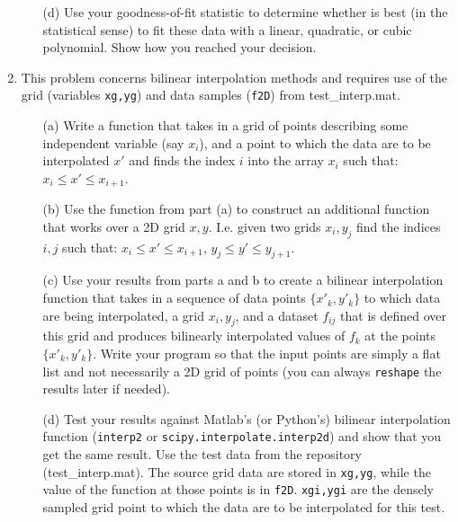 \documentclass{article}
\begin{document}
\begin{enumerate}
\begin{itemize}
    \item[(d)] Use your goodness-of-fit statistic to determine whether is best (in the statistical sense) to fit these data with a linear, quadratic, or cubic polynomial.  Show how you reached your decision.  
  \end{itemize}
  \item This problem concerns bilinear interpolation methods and requires use of the grid (variables \texttt{xg,yg}) and data samples (\texttt{f2D}) from \textsf{test\_interp.mat}.  
  \begin{itemize}
    \item[(a)]  Write a function that takes in a grid of points describing some independent variable (say $x_i$), and a point to which the data are to be interpolated $x'$ and finds the index $i$ into the array $x_i$ such that:  $x_i \le x' \le x_{i+1}$.  
    \item[(b)]  Use the function from part (a) to construct an additional function that works over a 2D grid $x,y$.  I.e. given two grids $x_i,y_j$ find the indices $i,j$ such that:  $x_i \le x' \le x_{i+1}$, $y_j \le y' \le y_{j+1}$.
    \item[(c)]  Use your results from parts a and b to create a bilinear interpolation function that takes in a sequence of data points $\{x'_k,y'_k\}$ to which data are being interpolated, a grid $x_i,y_j$, and a dataset $f_{ij}$ that is defined over this grid and produces bilinearly interpolated values of $f_k$ at the points $\{x'_k,y'_k\}$.  Write your program so that the input points are simply a flat list and not necessarily a 2D grid of points (you can always \texttt{reshape} the results later if needed).  
    \item[(d)]  Test your results against Matlab's (or Python's) bilinear interpolation function (\texttt{interp2} or \texttt{scipy.interpolate.interp2d}) and show that you get the same result.  Use the test data from the repository (\textsf{test\_interp.mat}).  The source grid data are stored in \texttt{xg,yg}, while the value of the function at those points is in \texttt{f2D}.  \texttt{xgi,ygi} are the densely sampled grid point to which the data are to be interpolated for this test.  
  \end{itemize} 
\end{enumerate}
\end{document}
